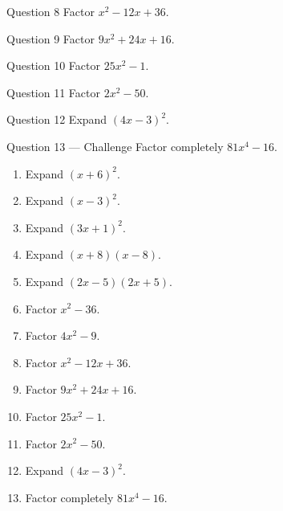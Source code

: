 \documentclass[11pt]{article}
\begin{document}
\begin{qbox}{Question 8}
Factor $x^2-12x+36$.\workspace{1.8cm}
\end{qbox}

\begin{qbox}{Question 9}
Factor $9x^2+24x+16$.\workspace{2.0cm}
\end{qbox}

\begin{qbox}{Question 10}
Factor $25x^2-1$.\workspace{1.8cm}
\end{qbox}

\begin{qbox}{Question 11}
Factor $2x^2-50$.\workspace{2.0cm}
\end{qbox}

\begin{qbox}{Question 12}
Expand $(4x-3)^2$.\workspace{1.8cm}
\end{qbox}

\begin{qbox}{Question 13 --- Challenge}
Factor completely $81x^4-16$.\workspace{2.6cm}
\end{qbox}

\clearpage
{}

\begin{recapbox}
\begin{multicols}{2}
\small
\begin{enumerate}[leftmargin=*,itemsep=3pt]
  \item Expand $(x+6)^2$.
  \item Expand $(x-3)^2$.
  \item Expand $(3x+1)^2$.
  \item Expand $(x+8)(x-8)$.
  \item Expand $(2x-5)(2x+5)$.
  \item Factor $x^2-36$.
  \item Factor $4x^2-9$.
  \item Factor $x^2-12x+36$.
  \item Factor $9x^2+24x+16$.
  \item Factor $25x^2-1$.
  \item Factor $2x^2-50$.
  \item Expand $(4x-3)^2$.
  \item Factor completely $81x^4-16$.
\end{enumerate}
\end{multicols}
\end{recapbox}
\end{document}
